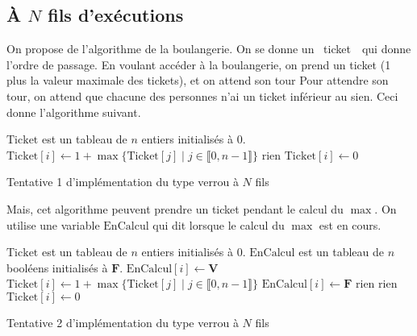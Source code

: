 \subsection{À $N$ fils d'exécutions}

On propose de l'algorithme de la boulangerie.
On se donne un \guillemotleft~ticket~\guillemotright\ qui donne l'ordre de passage.
En voulant accéder à la boulangerie, on prend un ticket (1 plus la valeur maximale des tickets), et on attend son tour
Pour attendre son tour, on attend que chacune des personnes n'ai un ticket inférieur au sien.
Ceci donne l'algorithme suivant.

\begin{algorithm}[H]
	\centering
	\begin{algorithmic}[1]
		\State $\mathrm{Ticket}$ est un tableau de $n$ entiers initialisés à $0$.
		\State $\mathrm{Ticket}[i] \gets 1 + \max \{\mathrm{Ticket}[j]  \mid j \in \llbracket 0,n-1 \rrbracket\} $
		\State rien
		\EndWhile
		\EndFor
		\EndProcedure
		\State $\mathrm{Ticket}[i] \gets 0$\/
		\EndProcedure
	\end{algorithmic}
	\caption{Tentative 1 d'implémentation du type \textsf{verrou} à $N$ fils}
\end{algorithm}

Mais, cet algorithme peuvent prendre un ticket pendant le calcul du $\max$. On utilise une variable $\mathrm{EnCalcul}$ qui dit lorsque le calcul du $\max$ est en cours.

\begin{algorithm}[H]
	\centering
	\begin{algorithmic}[1]
		\State $\mathrm{Ticket}$ est un tableau de $n$ entiers initialisés à $0$.
		\State $\mathrm{EnCalcul}$ est un tableau de $n$ booléens initialisés à $\mathbf{F}$.
		\State $\mathrm{EnCalcul}[i] \gets \mathbf{V}$
		\State $\mathrm{Ticket}[i] \gets 1 + \max \{\mathrm{Ticket}[j]  \mid j \in \llbracket 0,n-1 \rrbracket\} $
		\State $\mathrm{EnCalcul}[i] \gets \mathbf{F}$
		\State rien
		\EndWhile
		\State rien
		\EndWhile
		\EndFor
		\EndProcedure
		\State $\mathrm{Ticket}[i] \gets 0$\/
		\EndProcedure
	\end{algorithmic}
	\caption{Tentative 2 d'implémentation du type \textsf{verrou} à $N$ fils}
\end{algorithm}

